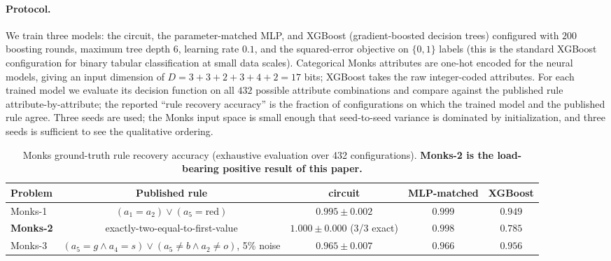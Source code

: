\documentclass{article}
\begin{document}
\paragraph{Protocol.}
We train three models: the circuit, the parameter-matched MLP, and XGBoost (gradient-boosted decision trees) configured with $200$ boosting rounds, maximum tree depth $6$, learning rate $0.1$, and the squared-error objective on $\{0, 1\}$ labels (this is the standard XGBoost configuration for binary tabular classification at small data scales).
Categorical Monks attributes are one-hot encoded for the neural models, giving an input dimension of $D = 3 + 3 + 2 + 3 + 4 + 2 = 17$ bits; XGBoost takes the raw integer-coded attributes.
For each trained model we evaluate its decision function on all $432$ possible attribute combinations and compare against the published rule attribute-by-attribute; the reported ``rule recovery accuracy'' is the fraction of configurations on which the trained model and the published rule agree.
Three seeds are used; the Monks input space is small enough that seed-to-seed variance is dominated by initialization, and three seeds is sufficient to see the qualitative ordering.

\begin{table}[H]
\centering
\caption{Monks ground-truth rule recovery accuracy (exhaustive evaluation over 432 configurations). \textbf{Monks-2 is the load-bearing positive result of this paper.}}
\label{tab:monks}
\begin{tabular}{lcccc}
\toprule
\textbf{Problem} & \textbf{Published rule} & \textbf{circuit} & \textbf{MLP-matched} & \textbf{XGBoost} \\
\midrule
Monks-1     & $(a_1{=}a_2) \lor (a_5{=}\text{red})$            & $0.995 \pm 0.002$ & $0.999$ & $0.949$ \\
\textbf{Monks-2} & exactly-two-equal-to-first-value             & $\mathbf{1.000 \pm 0.000}$ (3/3 exact) & $0.998$ & $\mathbf{0.785}$ \\
Monks-3     & $(a_5{=}g \land a_4{=}s) \lor (a_5{\neq}b \land a_2{\neq}o)$, 5\% noise & $0.965 \pm 0.007$ & $0.966$ & $0.956$ \\
\bottomrule
\end{tabular}
\end{table}
\end{document}
